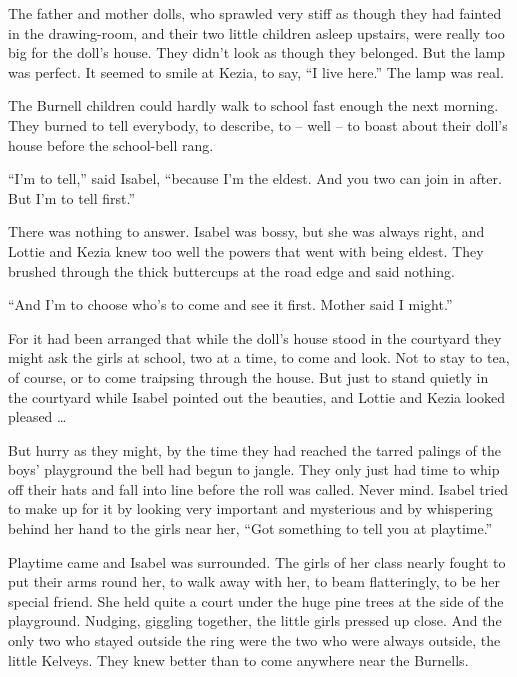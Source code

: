 \documentclass[10pt,a4paper]{article}
\begin{document}
The father and mother dolls, who sprawled very stiff as though they had fainted in the drawing-room, and their two little children asleep upstairs, were really too big for the doll’s house. They didn’t look as though they belonged. But the lamp was perfect. It seemed to smile at Kezia, to say, “I live here.” The lamp was real.

The Burnell children could hardly walk to school fast enough the next morning. They burned to tell everybody, to describe, to – well – to boast about their doll’s house before the school-bell rang.

“I’m to tell,” said Isabel, “because I’m the eldest. And you two can join in after. But I’m to tell first.”

There was nothing to answer. Isabel was bossy, but she was always right, and Lottie and Kezia knew too well the powers that went with being eldest. They brushed through the thick buttercups at the road edge and said nothing.

“And I’m to choose who’s to come and see it first. Mother said I might.”

For it had been arranged that while the doll’s house stood in the courtyard they might ask the girls at school, two at a time, to come and look. Not to stay to tea, of course, or to come traipsing through the house. But just to stand quietly in the courtyard while Isabel pointed out the beauties, and Lottie and Kezia looked pleased …

But hurry as they might, by the time they had reached the tarred palings of the boys’ playground the bell had begun to jangle. They only just had time to whip off their hats and fall into line before the roll was called. Never mind. Isabel tried to make up for it by looking very important and mysterious and by whispering behind her hand to the girls near her, “Got something to tell you at playtime.”

Playtime came and Isabel was surrounded. The girls of her class nearly fought to put their arms round her, to walk away with her, to beam flatteringly, to be her special friend. She held quite a court under the huge pine trees at the side of the playground. Nudging, giggling together, the little girls pressed up close. And the only two who stayed outside the ring were the two who were always outside, the little Kelveys. They knew better than to come anywhere near the Burnells.
\end{document}
